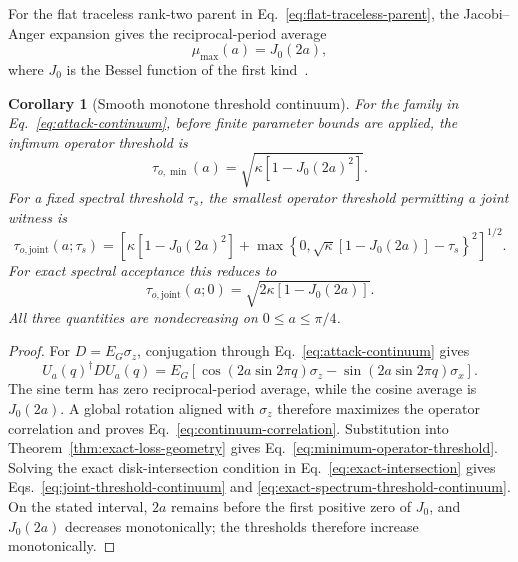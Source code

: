 \documentclass[11pt]{article}
\newtheorem{corollary}[theorem]{Corollary}
\begin{document}
For the flat traceless rank-two parent in Eq.~\eqref{eq:flat-traceless-parent}, the
Jacobi--Anger expansion gives the reciprocal-period average
\begin{equation}
 \mu_{\max}(a)=J_0(2a),
 \label{eq:continuum-correlation}
\end{equation}
where $J_0$ is the Bessel function of the first kind~\cite[Sec.~10.12]{dlmf1012}.

\begin{corollary}[Smooth monotone threshold continuum]
\label{cor:threshold-continuum}
For the family in Eq.~\eqref{eq:attack-continuum}, before finite parameter bounds are
applied, the infimum operator threshold is
\begin{equation}
 \tau_{o,\min}(a)
 =\sqrt{\kappa\left[1-J_0(2a)^2\right]}.
 \label{eq:minimum-operator-threshold}
\end{equation}
For a fixed spectral threshold $\tau_s$, the smallest operator threshold permitting a
joint witness is
\begin{equation}
 \tau_{o,\mathrm{joint}}(a;\tau_s)
 =\left[
 \kappa\left[1-J_0(2a)^2\right]
 +\max\!\left\{0,
   \sqrt{\kappa}\left[1-J_0(2a)\right]-\tau_s
  \right\}^{2}
 \right]^{1/2}.
 \label{eq:joint-threshold-continuum}
\end{equation}
For exact spectral acceptance this reduces to
\begin{equation}
 \tau_{o,\mathrm{joint}}(a;0)
 =\sqrt{2\kappa\left[1-J_0(2a)\right]}.
 \label{eq:exact-spectrum-threshold-continuum}
\end{equation}
All three quantities are nondecreasing on $0\le a\le\pi/4$.
\end{corollary}

\begin{proof}
For $D=E_G\sigma_z$, conjugation through Eq.~\eqref{eq:attack-continuum} gives
\[
 U_a(q)^\dagger D U_a(q)
 =E_G\left[
  \cos\!\left(2a\sin2\pi q\right)\sigma_z
  -\sin\!\left(2a\sin2\pi q\right)\sigma_x
 \right].
\]
The sine term has zero reciprocal-period average, while the cosine average is
$J_0(2a)$. A global rotation aligned with $\sigma_z$ therefore maximizes the operator
correlation and proves Eq.~\eqref{eq:continuum-correlation}. Substitution into
Theorem~\ref{thm:exact-loss-geometry} gives
Eq.~\eqref{eq:minimum-operator-threshold}. Solving the exact disk-intersection condition
in Eq.~\eqref{eq:exact-intersection} gives
Eqs.~\eqref{eq:joint-threshold-continuum} and
\eqref{eq:exact-spectrum-threshold-continuum}. On the stated interval, $2a$ remains
before the first positive zero of $J_0$, and $J_0(2a)$ decreases monotonically; the
thresholds therefore increase monotonically.
\end{proof}
\end{document}
